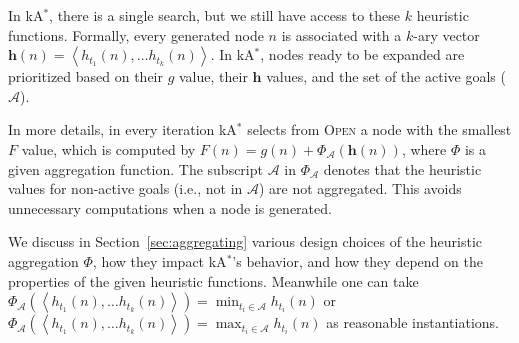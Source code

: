 \documentclass[twoside,11pt]{article}
\newcommand{\astar}{A$^*$\xspace}
\newcommand{\kastar}{kA$^*$\xspace}
\newcommand{\tuple}[1]{\ensuremath{\left \langle #1 \right \rangle }}
\newcommand{\open}{\textsc{Open}\xspace}
\newcommand{\activeg}{\mathcal{A}}
\newcommand{\vect}[1]{\mathbf{#1}}
\begin{document}
In \kastar, there is a single search, but we still have access to these $k$ heuristic functions. Formally, every generated node $n$ is associated with a $k$-ary vector $\vect{h}(n) = \tuple{h_{t_1}(n), \ldots h_{t_k}(n)}$. In \kastar, nodes ready to be expanded are prioritized based on their $g$ value, their $\vect{h}$ values, and the set of the active goals ($\activeg$). 

In more details, in every iteration \kastar selects from \open a node with the smallest $F$ value, which is computed by $F(n) = g(n) + \Phi_{\activeg}(\vect{h}(n))$, 
where $\Phi$ is a given aggregation function. 
The subscript $\activeg$ in $\Phi_\activeg$ denotes that the heuristic values for non-active goals (i.e., not in $\activeg$) are not aggregated.
This avoids  unnecessary computations when a node is generated. %
 
We discuss in Section~\ref{sec:aggregating} various design choices of  the heuristic aggregation $\Phi$, how they impact \kastar's behavior, and how they depend on the properties of the given heuristic functions. %
Meanwhile one can take $\Phi_{\activeg}(\tuple{h_{t_1}(n), \dots h_{t_k}(n)}) = \min_{t_i\in\activeg} h_{t_i}(n)$ or $\Phi_{\activeg}(\tuple{h_{t_1}(n), \dots h_{t_k}(n)}) = \max_{t_i\in\activeg} h_{t_i}(n)$ as reasonable instantiations. 



 





\end{document}
